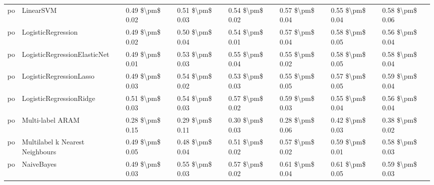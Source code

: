 \begin{tabular}{llllllll}
      po &                       LinearSVM & 0.49 \$\textbackslash pm\$ 0.02 &           0.51 \$\textbackslash pm\$ 0.03 &       0.54 \$\textbackslash pm\$ 0.02 &        0.57 \$\textbackslash pm\$ 0.04 &                         0.55 \$\textbackslash pm\$ 0.04 &     0.58 \$\textbackslash pm\$ 0.06 \\
      po &              LogisticRegression & 0.49 \$\textbackslash pm\$ 0.02 &           0.50 \$\textbackslash pm\$ 0.04 &       0.54 \$\textbackslash pm\$ 0.01 &        0.57 \$\textbackslash pm\$ 0.04 &                         0.58 \$\textbackslash pm\$ 0.05 &     0.56 \$\textbackslash pm\$ 0.04 \\
      po &    LogisticRegressionElasticNet & 0.49 \$\textbackslash pm\$ 0.01 &           0.53 \$\textbackslash pm\$ 0.03 &       0.55 \$\textbackslash pm\$ 0.04 &        0.55 \$\textbackslash pm\$ 0.02 &                         0.58 \$\textbackslash pm\$ 0.05 &     0.58 \$\textbackslash pm\$ 0.04 \\
      po &         LogisticRegressionLasso & 0.49 \$\textbackslash pm\$ 0.03 &           0.54 \$\textbackslash pm\$ 0.02 &       0.53 \$\textbackslash pm\$ 0.03 &        0.55 \$\textbackslash pm\$ 0.05 &                         0.57 \$\textbackslash pm\$ 0.05 &     0.59 \$\textbackslash pm\$ 0.04 \\
      po &         LogisticRegressionRidge & 0.51 \$\textbackslash pm\$ 0.03 &           0.54 \$\textbackslash pm\$ 0.03 &       0.57 \$\textbackslash pm\$ 0.02 &        0.59 \$\textbackslash pm\$ 0.03 &                         0.55 \$\textbackslash pm\$ 0.04 &     0.56 \$\textbackslash pm\$ 0.04 \\
      po &                Multi-label ARAM & 0.28 \$\textbackslash pm\$ 0.15 &           0.29 \$\textbackslash pm\$ 0.11 &       0.30 \$\textbackslash pm\$ 0.03 &        0.28 \$\textbackslash pm\$ 0.06 &                         0.42 \$\textbackslash pm\$ 0.03 &     0.38 \$\textbackslash pm\$ 0.02 \\
      po & Multilabel k Nearest Neighbours & 0.49 \$\textbackslash pm\$ 0.05 &           0.48 \$\textbackslash pm\$ 0.04 &       0.51 \$\textbackslash pm\$ 0.02 &        0.57 \$\textbackslash pm\$ 0.02 &                         0.59 \$\textbackslash pm\$ 0.01 &     0.58 \$\textbackslash pm\$ 0.03 \\
      po &                      NaiveBayes & 0.49 \$\textbackslash pm\$ 0.03 &           0.55 \$\textbackslash pm\$ 0.03 &       0.57 \$\textbackslash pm\$ 0.02 &        0.61 \$\textbackslash pm\$ 0.04 &                         0.61 \$\textbackslash pm\$ 0.05 &     0.59 \$\textbackslash pm\$ 0.03 \\

\end{tabular}
